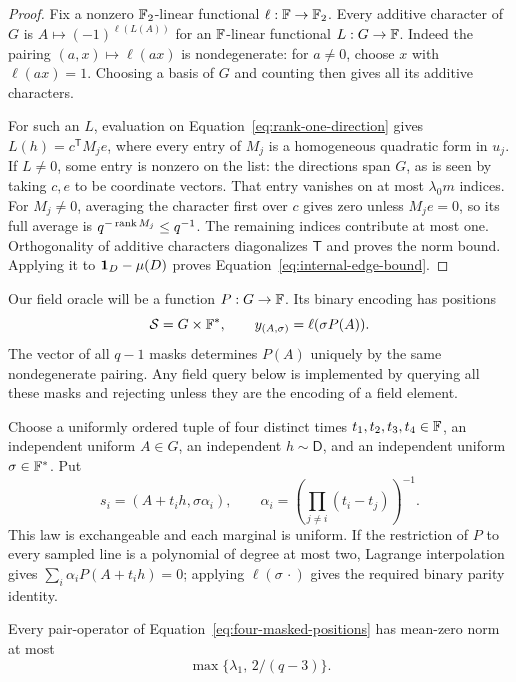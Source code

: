 \begin{proof}
Fix a nonzero $\mathbb F_2$-linear functional $\ell:\mathbb F\to\mathbb F_2$.
Every additive character of $G$ is
$A\mapsto(-1)^{\ell(L(A))}$ for an $\mathbb F$-linear functional $L:G\to\mathbb F$.
Indeed the pairing $(a,x)\mapsto\ell(ax)$ is nondegenerate: for $a\ne0$,
choose $x$ with $\ell(ax)=1$. Choosing a basis of $G$ and counting then
gives all its additive characters.

For such an $L$, evaluation on Equation~\ref{eq:rank-one-direction}
gives $L(h)=c^{\mathsf T}M_j e$, where every entry of $M_j$ is a
homogeneous quadratic form in $u_j$. If $L\ne0$, some entry is nonzero
on the list: the directions span $G$, as is seen by taking $c,e$ to be
coordinate vectors. That entry vanishes on at most $\lambda_0 m$
indices. For $M_j\ne0$, averaging the character first over $c$ gives
zero unless $M_j e=0$, so its full average is
$q^{-\operatorname{rank} M_j}\leq q^{-1}$. The remaining indices contribute at most
one. Orthogonality of additive characters diagonalizes $\mathsf T$ and
proves the norm bound. Applying it to
$\mathbf 1_D-\mu(D)$ proves Equation~\ref{eq:internal-edge-bound}.
\end{proof}

Our field oracle will be a function $P:G\to\mathbb F$. Its binary encoding has
positions
\[
 \mathcal S=G\times\mathbb F^*,\qquad
 y_{(A,\sigma)}=\ell(\sigma P(A)).
\]
The vector of all $q-1$ masks determines $P(A)$ uniquely by the same
nondegenerate pairing. Any field query below is implemented by querying
all these masks and rejecting unless they are the encoding of a field
element.

Choose a uniformly ordered tuple of four distinct times
$t_1,t_2,t_3,t_4\in\mathbb F$, an independent uniform $A\in G$, an independent
$h\sim\mathsf D$, and an independent uniform $\sigma\in\mathbb F^*$. Put
\begin{equation}\label{eq:four-masked-positions}
 s_i=(A+t_i h,\sigma\alpha_i),\qquad
 \alpha_i=\left(\prod_{j\ne i}(t_i-t_j)\right)^{-1}.
\end{equation}
This law is exchangeable and each marginal is uniform. If the restriction
of $P$ to every sampled line is a polynomial of degree at most two,
Lagrange interpolation gives
$\sum_i\alpha_iP(A+t_i h)=0$; applying $\ell(\sigma\,\cdot)$ gives the
required binary parity identity.

\begin{lemma}\label{lem:masked-pair-mixing}
Every pair-operator of Equation~\ref{eq:four-masked-positions} has
mean-zero norm at most
\[
 \max\{\lambda_1,\,2/(q-3)\}.
\]
\end{lemma}

